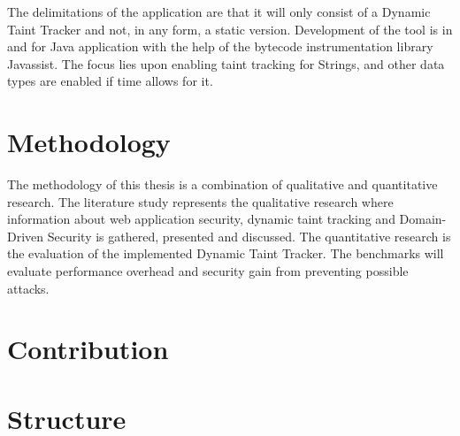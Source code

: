 The delimitations of the application are that it will only consist of a Dynamic Taint Tracker and not, in any form, a static version. Development of the tool is in and for Java application with the help of the bytecode instrumentation library Javassist. The focus lies upon enabling taint tracking for Strings, and other data types are enabled if time allows for it.



\section{Methodology}
\label{Methodology}

The methodology of this thesis is a combination of qualitative and quantitative research. The literature study represents the qualitative research where information about web application security, dynamic taint tracking and Domain-Driven Security is gathered, presented and discussed. The quantitative research is the evaluation of the implemented Dynamic Taint Tracker. The benchmarks will evaluate performance overhead and security gain from preventing possible attacks.



\section{Contribution}
\label{Contribution}



\section{Structure}
\label{Structure}
